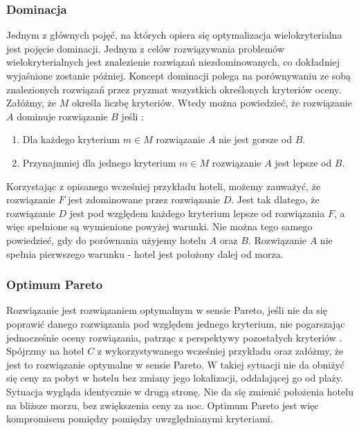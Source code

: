 \documentclass[twoside]{iisthesis}
\begin{document}
\subsubsection{Dominacja}
Jednym z głównych pojęć, na których opiera się optymalizacja wielokryterialna jest pojęcie dominacji. Jednym z celów rozwiązywania problemów wielokryterialnych jest znalezienie rozwiązań niezdominowanych, co dokładniej wyjaśnione zostanie później. Koncept dominacji polega na porównywaniu ze sobą znalezionych rozwiązań przez pryzmat wszystkich określonych kryteriów oceny. Załóżmy, że $M$ określa liczbę kryteriów. Wtedy można powiedzieć, że rozwiązanie $A$ dominuje rozwiązanie $B$ jeśli \cite{book}:\\
\begin{enumerate}
	\item Dla każdego kryterium $m \in M$ rozwiązanie $A$ nie jest gorsze od $B$.
	\item Przynajmniej dla jednego kryterium $m \in M$ rozwiązanie $A$ jest lepsze od $B$.\\
\end{enumerate}
Korzystając z opisanego wcześniej przykładu hoteli, możemy zauważyć, że rozwiązanie $F$ jest zdominowane przez rozwiązanie $D$. Jest tak dlatego, że rozwiązanie $D$ jest pod względem każdego kryterium lepsze od rozwiązania $F$, a więc spełnione są wymienione powyżej warunki. Nie można tego samego powiedzieć, gdy do porównania użyjemy hotelu $A$ oraz $B$. Rozwiązanie $A$ nie spełnia pierwszego warunku - hotel jest położony dalej od morza.

\subsubsection{Optimum Pareto}
Rozwiązanie jest rozwiązaniem optymalnym w sensie Pareto, jeśli nie da się poprawić danego rozwiązania pod względem jednego kryterium, nie pogarszając jednocześnie oceny rozwiązania, patrząc z perspektywy pozostałych kryteriów \cite{wiki_pareto}. Spójrzmy na hotel $C$ z wykorzystywanego wcześniej przykładu oraz załóżmy, że jest to rozwiązanie optymalne w sensie Pareto. W takiej sytuacji nie da obniżyć się ceny za pobyt w hotelu bez zmiany jego lokalizacji, oddalającej go od plaży. Sytuacja wygląda identycznie w drugą stronę. Nie da się zmienić położenia hotelu na bliższe morzu, bez zwiększenia ceny za noc. Optimum Pareto jest więc kompromisem pomiędzy pomiędzy uwzględnianymi kryteriami.
\end{document}
